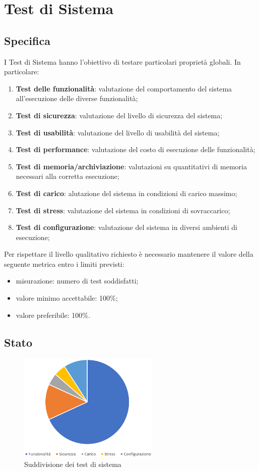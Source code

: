 \section{Test di Sistema}

	\subsection{Specifica}
		I Test di Sistema hanno l'obiettivo di testare particolari proprietà globali. In particolare:
		\begin{enumerate}
			\item{\textbf{Test delle funzionalità}: valutazione del comportamento del sistema all'esecuzione delle diverse funzionalità;}
			\item{\textbf{Test di sicurezza}: valutazione del livello di sicurezza del sistema;}
			\item{\textbf{Test di usabilità}: valutazione del livello di usabilità del sistema;}
			\item{\textbf{Test di performance}: valutazione del costo di esecuzione delle funzionalità;}
			\item{\textbf{Test di memoria/archiviazione}: valutazioni su quantitativi di memoria necessari alla corretta esecuzione;}
			\item{\textbf{Test di carico}: alutazione del sistema in condizioni di carico massimo;}
			\item{\textbf{Test di stress}: valutazione del sistema in condizioni di sovraccarico;}
			\item{\textbf{Test di configurazione}: valutazione del sistema in diversi ambienti di esecuzione;}
		\end{enumerate}
		Per rispettare il livello qualitativo richiesto è necessario mantenere il valore della seguente metrica entro i limiti previsti:
		\begin{itemize}
			\item{misurazione: numero di test soddisfatti;}
			\item{valore minimo accettabile: 100\%;}
			\item{valore preferibile: 100\%.}
		\end{itemize}
	
	
	\subsection{Stato}
		
		\begin{figure}[H]
			\centering
			\includegraphics[width=0.6\textwidth]{./res/sections/test/sistema/graph.png}
			\caption{Suddivisione dei test di sistema}
		\end{figure}
	
		